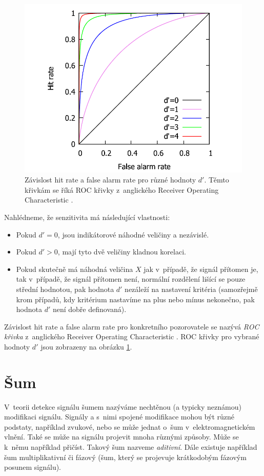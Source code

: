 \begin{figure}[h!]
  \includegraphics[width=.8\linewidth]{graphs/ROC.pdf}
  \centering
\caption{Závislost hit rate a false alarm rate pro různé hodnoty $d'$. Těmto křivkám se říká ROC křivky z~anglického Receiver Operating Characteristic \citep{SwetsSDT,GreenSDT}.} 
\label{obr:dprime} 
\end{figure}


Nahlédneme, že senzitivita má následující vlastnosti:
\begin{itemize}
\item Pokud $d' = 0$, jsou indikátorové náhodné veličiny  a  nezávislé.
\item Pokud $d' > 0$, mají tyto dvě veličiny kladnou korelaci.
\item Pokud skutečně má náhodná veličina $X$ jak v~případě, že signál přítomen je, tak v~případě, že signál přítomen není, normální rozdělení lišící se pouze střední hodnotou, pak hodnota $d'$ nezáleží na nastavení kritéria (samozřejmě krom případů, kdy kritérium nastavíme na plus nebo mínus nekonečno, pak hodnota $d'$ není dobře definovaná).
\end{itemize}

Závislost hit rate a false alarm rate pro konkretního pozorovatele se nazývá {\it ROC křivka} z~anglického Receiver Operating Characteristic \citep{SwetsSDT,GreenSDT}. ROC křivky pro vybrané hodnoty $d'$ jsou zobrazeny na obrázku \ref{obr:dprime}.  

\section{Šum}

V~teorii detekce signálu šumem nazýváme nechtěnou (a typicky neznámou)
modifikaci signálu.  Signály a s~nimi spojené modifikace mohou být různé
podstaty, například zvukové, nebo se může jednat o~šum v~elektromagnetickém
vlnění. Také se může na signálu projevit mnoha různými způsoby. Může se k~němu
například přičíst. Takový šum nazveme {\it aditivní}. Dále existuje například
 šum multiplikativní či fázový (šum, který se projevuje krátkodobým
fázovým posunem signálu).

